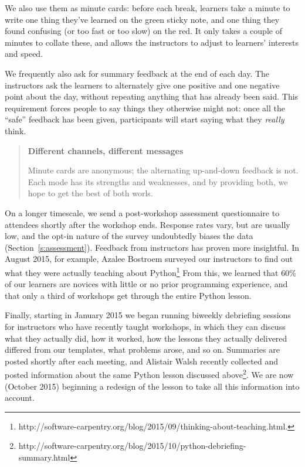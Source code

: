 \documentclass[10pt,a4paper,twocolumn]{article}
\begin{document}
We also use them as minute cards: before each break, learners take a
minute to write one thing they've learned on the green sticky note,
and one thing they found confusing (or too fast or too slow) on the
red. It only takes a couple of minutes to collate these, and allows
the instructors to adjust to learners' interests and speed.

We frequently also ask for summary feedback at the end of each day.
The instructors ask the learners to alternately give one positive and
one negative point about the day, without repeating anything that has
already been said.  This requirement forces people to say things they
otherwise might not: once all the ``safe'' feedback has been given,
participants will start saying what they \emph{really} think.

\begin{quote}
\textbf{Different channels, different messages}

Minute cards are anonymous; the alternating up-and-down feedback is
not.  Each mode has its strengths and weaknesses, and by providing
both, we hope to get the best of both worls.
\end{quote}

On a longer timescale, we send a post-workshop assessment
questionnaire to attendees shortly after the workshop ends.  Response
rates vary, but are usually low, and the opt-in nature of the survey
undoubtedly biases the data (Section~\ref{s:assessment}).  Feedback
from instructors has proven more insightful.  In August 2015, for
example, Azalee Bostroem surveyed our instructors to find out what
they were actually teaching about
Python\footnote{http://software-carpentry.org/blog/2015/09/thinking-about-teaching.html.}
From this, we learned that 60\% of our learners are novices with
little or no prior programming experience, and that only a third of
workshops get through the entire Python lesson.

Finally, starting in January 2015 we began running biweekly debriefing
sessions for instructors who have recently taught workshops, in which
they can discuss what they actually did, how it worked, how the
lessons they actually delivered differed from our templates, what
problems arose, and so on.  Summaries are posted shortly after each
meeting, and Alistair Walsh recently collected and posted information
about the same Python lesson discussed
above\footnote{http://software-carpentry.org/blog/2015/10/python-debriefing-summary.html}.
We are now (October 2015) beginning a redesign of the lesson to take
all this information into account.
\end{document}
